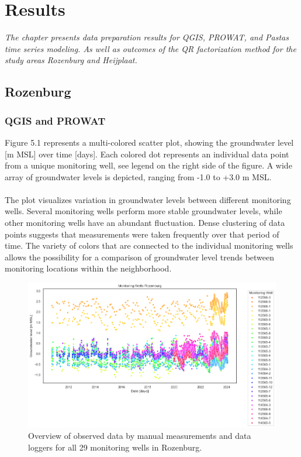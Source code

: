 \chapter{Results}
\label{chapter:results}

\emph{The chapter presents data preparation results for QGIS, PROWAT, and Pastas time series modeling. As well as outcomes of the QR factorization method for the study areas Rozenburg and Heijplaat.}

\section{Rozenburg}
\subsection{QGIS and PROWAT}

Figure 5.1 represents a multi-colored scatter plot, showing the groundwater level [m MSL] over time [days]. Each colored dot represents an individual data point from a unique monitoring well, see legend on the right side of the figure. A wide array of groundwater levels is depicted, ranging from -1.0 to +3.0 m MSL. \\
\\
The plot visualizes variation in groundwater levels between different monitoring wells. Several monitoring wells perform more stable groundwater levels, while other monitoring wells have an abundant fluctuation. Dense clustering of data points suggests that measurements were taken frequently over that period of time. The variety of colors that are connected to the individual monitoring wells allows the possibility for a comparison of groundwater level trends between monitoring locations within the neighborhood. \\
\begin{figure}[h]
    \centering
    \includegraphics[width=0.80\linewidth]{rozscatter.png}
    \caption{Overview of observed data by manual measurements and data loggers for all 29 monitoring wells in Rozenburg.}
\end{figure}\\

